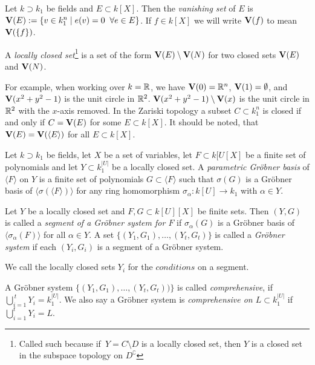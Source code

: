\begin{definition}
  Let $k \supset k_{1}$ be fields and $E \subset k[X]$. Then the \textit{vanishing set} of $E$ is $\operatorname{\mathbf V}(E) := \{v \in k_{1}^{n} \mid e(v) = 0 \;\; \forall e \in E\}$.  If $f \in k[X]$ we will write $\operatorname{\mathbf V}(f)$ to mean $\operatorname{\mathbf V}(\{f\})$.

  A \textit{locally closed set}\footnote{Called such because if $\,Y = C \setminus D$ is a locally closed set, then $Y$ is a closed set in the subspace topology on $D^{\complement}$} is a set of the form $\operatorname{\mathbf V}(E) \setminus \operatorname{\mathbf V}(N)$ for two closed sets $\operatorname{\mathbf V}(E)$ and $\operatorname{\mathbf V}(N)$.
\end{definition}

For example, when working over $k = \mathbb{R}$, we have $\operatorname{\mathbf V}(0) = \mathbb{R}^{n}$, $\operatorname{\mathbf V}(1) = \emptyset$, and $\operatorname{\mathbf V}(x^{2} + y^{2} - 1)$ is the unit circle in $\mathbb{R}^{2}$. $\operatorname{\mathbf V}(x^{2} + y^{2} - 1) \setminus \operatorname{\mathbf V}(x)$ is the unit circle in $\mathbb{R}^{2}$ with the  $x$-axis removed. In the Zariski topology a subset $C \subset k_{1}^{n}$ is closed if and only if $C = \operatorname{\mathbf V}(E)$ for some $E \subset k[X]$. It should be noted, that $\operatorname{\mathbf V}(E) = \operatorname{\mathbf V}(\langle E \rangle)$ for all $E \subset k[X]$.

\begin{definition}
  Let $k \supset k_{1}$ be fields, let $X$ be a set of variables, let $F \subset k[U[X]$ be a finite set of polynomials and let $Y \subset k_{1}^{|U|}$ be a locally closed set. A \textit{parametric Gröbner basis} of $\langle F \rangle$ on $Y$ is a finite set of polynomials $G \subset \langle F \rangle$ such that $\sigma(G)$ is a Gröbner basis of $\langle \sigma(\langle F \rangle) \rangle$ for any ring homomorphism $\sigma_{\alpha} : k[U] \to k_{1}$ with $\alpha \in Y$.
\end{definition}
\begin{definition}
  Let $Y$ be a locally closed set and $F, G \subset k[U][X]$ be finite sets. Then $(Y, G)$ is called a \textit{segment of a Gröbner system for $F$} if $\sigma_{\alpha}(G)$ is a Gröbner basis of $\langle \sigma_{\alpha}(F) \rangle$ for all $\alpha \in Y$. A set $\{(Y_{1}, G_{1}), \dots, (Y_{t}, G_{t})\}$ is called a \textit{Gröbner system} if each $(Y_{i}, G_{i})$ is a segment of a Gröbner system.

  We call the locally closed sets $Y_{i}$ for the $\textit{conditions}$ on a segment.

  A Gröbner system $\{(Y_{1}, G_{1}), \dots, (Y_{t}, G_{t}))\}$ is called \textit{comprehensive}, if $\bigcup_{i=1}^{\,t}Y_{i} = k_{1}^{|U|}$. We also say a Gröbner system is \textit{comprehensive on $L \subset k_{1}^{|U|}$} if $\bigcup_{i=1}^{t}Y_{i} = L$.
\end{definition}

